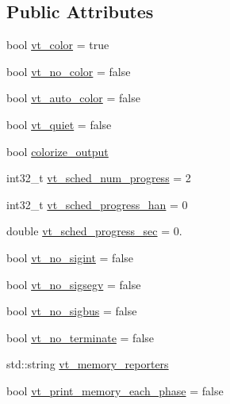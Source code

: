 \subsection*{Public Attributes}
\begin{DoxyCompactItemize}
\item 
bool \hyperlink{structvt_1_1arguments_1_1_app_config_a8add08e932dec103e52255fd77e15b0f}{vt\+\_\+color} = true
\item 
bool \hyperlink{structvt_1_1arguments_1_1_app_config_ac3821fd047fac387f9086b165f341bf6}{vt\+\_\+no\+\_\+color} = false
\item 
bool \hyperlink{structvt_1_1arguments_1_1_app_config_ab0d9d89764f3dde07ebb0cbf67b60c9b}{vt\+\_\+auto\+\_\+color} = false
\item 
bool \hyperlink{structvt_1_1arguments_1_1_app_config_ad0dc6c132075d1b94373d298988d1825}{vt\+\_\+quiet} = false
\item 
bool \hyperlink{structvt_1_1arguments_1_1_app_config_abedaac3de66d21a54052e2e9ba8bca27}{colorize\+\_\+output}
\item 
int32\+\_\+t \hyperlink{structvt_1_1arguments_1_1_app_config_a2b88484f357d03bcb8690a7be8f98f1f}{vt\+\_\+sched\+\_\+num\+\_\+progress} = 2
\item 
int32\+\_\+t \hyperlink{structvt_1_1arguments_1_1_app_config_adea83e3068b3a30b9e0e45740e9a3587}{vt\+\_\+sched\+\_\+progress\+\_\+han} = 0
\item 
double \hyperlink{structvt_1_1arguments_1_1_app_config_a93172de4d36eb63c2619ab9508f46058}{vt\+\_\+sched\+\_\+progress\+\_\+sec} = 0.
\item 
bool \hyperlink{structvt_1_1arguments_1_1_app_config_a1547bc236f0192f89dec89409bdfeabc}{vt\+\_\+no\+\_\+sigint} = false
\item 
bool \hyperlink{structvt_1_1arguments_1_1_app_config_a819ba88b195cfd735798fbcb18e36408}{vt\+\_\+no\+\_\+sigsegv} = false
\item 
bool \hyperlink{structvt_1_1arguments_1_1_app_config_a897190a29b558e54026b8a3b471f4f79}{vt\+\_\+no\+\_\+sigbus} = false
\item 
bool \hyperlink{structvt_1_1arguments_1_1_app_config_aceae5a1e67a5001dc56d4fa352dddf4a}{vt\+\_\+no\+\_\+terminate} = false
\item 
std\+::string \hyperlink{structvt_1_1arguments_1_1_app_config_acb03c37af0097278fddcdd456e5312de}{vt\+\_\+memory\+\_\+reporters}
\item 
bool \hyperlink{structvt_1_1arguments_1_1_app_config_ab7fd4a5032ddaca35301d27eb63d9d02}{vt\+\_\+print\+\_\+memory\+\_\+each\+\_\+phase} = false

\end{DoxyCompactItemize}

